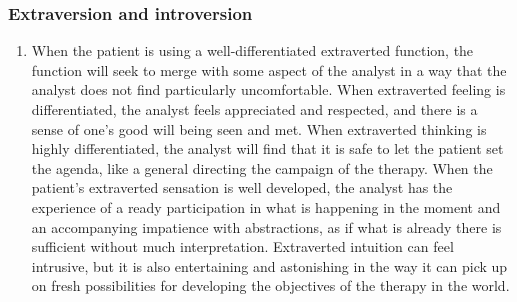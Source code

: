 \subsubsection{Extraversion and introversion}

\begin{enumerate}

\item {} When the patient is using a
well-differentiated extraverted function, the function will seek to merge with
some aspect of the analyst in a way that the analyst does not find particularly
uncomfortable. When extraverted feeling is differentiated, the analyst feels
appreciated and respected, and there is a sense of one’s good will being seen
and met. When extraverted thinking is highly differentiated, the analyst will
find that it is safe to let the patient set the agenda, like a general
directing the campaign of the therapy. When the patient’s extraverted sensation
is well developed, the analyst has the experience of a ready participation in
what is happening in the moment and an accompanying impatience with
abstractions, as if what is already there is sufficient without much
interpretation. Extraverted intuition can feel intrusive, but it is also
entertaining and astonishing in the way it can pick up on fresh possibilities
for developing the objectives of the therapy in the world.


\end{enumerate}
